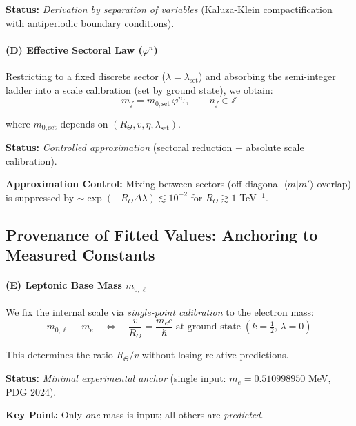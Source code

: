 \documentclass[12pt]{article}
\theoremstyle{definition}
\theoremstyle{plain}
\begin{document}
\textbf{Status:} \textit{Derivation by separation of variables} (Kaluza-Klein compactification with antiperiodic boundary conditions).

\paragraph{(D) Effective Sectoral Law ($\varphi^n$)}

Restricting to a fixed discrete sector ($\lambda = \lambda_{\text{set}}$) and absorbing the semi-integer ladder into a scale calibration (set by ground state), we obtain:
\begin{equation}
\boxed{m_f = m_{0,\text{set}} \, \varphi^{n_f}, \qquad n_f \in \mathbb{Z}}
\end{equation}

where $m_{0,\text{set}}$ depends on $(R_\Theta, v, \eta, \lambda_{\text{set}})$.

\textbf{Status:} \textit{Controlled approximation} (sectoral reduction + absolute scale calibration).

\textbf{Approximation Control:} Mixing between sectors (off-diagonal $\langle m | m' \rangle$ overlap) is suppressed by $\sim \exp(-R_\Theta \Delta\lambda) \lesssim 10^{-2}$ for $R_\Theta \gtrsim 1$ TeV$^{-1}$.

\subsection{Provenance of Fitted Values: Anchoring to Measured Constants}

\paragraph{(E) Leptonic Base Mass $m_{0,\ell}$}

We fix the internal scale via \textit{single-point calibration} to the electron mass:
\begin{equation}
m_{0,\ell} \equiv m_e \quad \Longleftrightarrow \quad \frac{v}{R_\Theta} = \frac{m_e c}{\hbar} \;\text{at ground state}\; (k = \tfrac{1}{2},\, \lambda = 0)
\end{equation}

This determines the ratio $R_\Theta / v$ without losing relative predictions.

\textbf{Status:} \textit{Minimal experimental anchor} (single input: $m_e = 0.510998950$ MeV, PDG 2024).

\textbf{Key Point:} Only \textit{one} mass is input; all others are \textit{predicted}.
\end{document}
